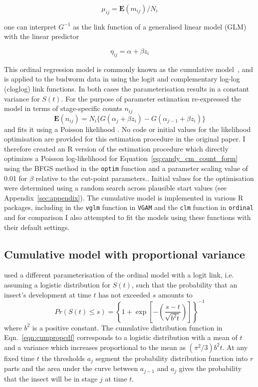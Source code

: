 $$\mu_{ij} = \mathbf{E}(m_{ij})/N_i$$

 one can interpret $G^{-1}$ as the link function of a generalised linear model (GLM) with the linear predictor 

$$\eta_{ij}=\alpha+\beta z_i$$

This ordinal regression model is commonly known as the cumulative model~\citep{burkner2019ordinal}, and is applied to the budworm data in \citep{candy1991modeling} using the logit and complementary log-log (cloglog) link functions. 
In both cases the parameterisation results in a constant variance for $S(t)$.
For the purpose of parameter estimation \citet{candy1991modeling} re-expressed the model in terms of stage-specific counts $n_{ij}$  
\begin{equation}
\mathbf{E}(n_{ij})=N_i\{G(\alpha_j + \beta z_i) - G(\alpha_{j-1} + \beta z_i)\}
\label{eq:candy_cm_count_form}
\end{equation}
and fits it using a Poisson likelihood \citep{thompson1981composite}. 
No code or initial values for the likelihood optimisation are provided for this estimation procedure in the original paper.   
I therefore created an R version of the estimation procedure which directly optimizes a Poisson log-likelihood for Equation~\ref{eq:candy_cm_count_form} using the BFGS method in the \verb+optim+ function and a parameter scaling value of 0.01 for $\beta$ relative to the cut-point parameters..
Initial values for the optimisation were determined using a random search across plausible start values (see Appendix~\ref{sec:appendix}).
 The cumulative model is implemented in various R packages, including in the \verb+vglm+ function in \verb+VGAM+ \citep{VGAM} and the \verb+clm+ function in \verb+ordinal+ \cite{ordinal} and for comparison I also attempted to fit the models using these functions with their default settings.

\subsection{Cumulative model with proportional variance}
\citet{dennis1986stochastic} used a different parameterisation of the ordinal model with a logit link, i.e. assuming a logistic distribution for $S(t)$, such that the probability that an insect's development at time $t$ has not exceeded $s$ amounts to 
\begin{equation}
Pr(S(t) \leq s) = \left\{ 1 + \exp\left[-\left(\frac{s-t}{\sqrt{b^2t}}\right)\right]\right\}^{-1}
\label{eqn:cumpropcdf}
\end{equation}
where $b^2$ is a positive constant. 
The cumulative distribution function in Eqn.~\ref{eqn:cumpropcdf} corresponds to a logistic distribution with a mean of $t$ and a variance which increases proportional to the mean as $(\pi^2/3)b^2t$.
At any fixed time $t$ the thresholds $a_j$ segment the probability distribution function into $r$ parts and the area under the curve between $a_{j-1}$ and $a_j$ gives the probability that the insect will be in stage $j$ at time $t$.

